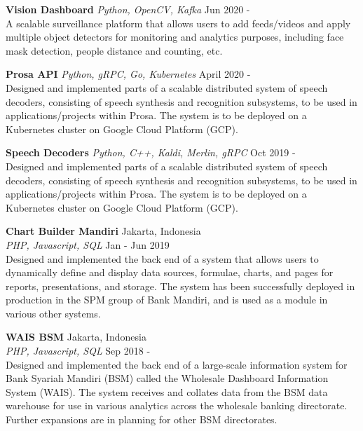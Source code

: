 \documentclass[a4paper]{article}
\begin{document}
{\textbf{Vision Dashboard}}
{\sl Python, OpenCV, Kafka} \hfill Jun 2020 - \\
A scalable surveillance platform that allows users to add feeds/videos and apply
multiple object detectors for monitoring and analytics purposes, including face
mask detection, people distance and counting, etc.\\
\vspace*{2mm}

{\textbf{Prosa API}} 
{\sl Python, gRPC, Go, Kubernetes} \hfill April 2020 - \\
Designed and implemented parts of a scalable distributed system of speech
decoders, consisting of speech synthesis and recognition subsystems, to be used
in applications/projects within Prosa. The system is to be deployed on a
Kubernetes cluster on Google Cloud Platform (GCP).\\
\vspace*{2mm}

{\textbf{Speech Decoders}}
{\sl Python, C++, Kaldi, Merlin, gRPC} \hfill Oct 2019 - \\
Designed and implemented parts of a scalable distributed system of speech
decoders, consisting of speech synthesis and recognition subsystems, to be used
in applications/projects within Prosa. The system is to be deployed on a
Kubernetes cluster on Google Cloud Platform (GCP).\\
\vspace*{2mm}

{\textbf{Chart Builder Mandiri}} \hfill Jakarta, Indonesia \\
{\sl PHP, Javascript, SQL} \hfill Jan - Jun 2019 \\
\vspace*{1mm}
Designed and implemented the back end of a system that allows users to
dynamically define and display data sources, formulae, charts, and pages for
reports, presentations, and storage. The system has been successfully deployed
in production in the SPM group of Bank Mandiri, and is used as a module in
various other systems.\\
\vspace*{3mm}

{\textbf{WAIS BSM}} \hfill Jakarta, Indonesia \\
{\sl PHP, Javascript, SQL} \hfill Sep 2018 - \\
\vspace*{1mm}
Designed and implemented the back end of a large-scale information system for
Bank Syariah Mandiri (BSM) called the Wholesale Dashboard Information System
(WAIS). The system receives and collates data from the BSM data warehouse for
use in various analytics across the wholesale banking directorate. Further
expansions are in planning for other BSM directorates.\\
\vspace*{3mm}
\end{document}
